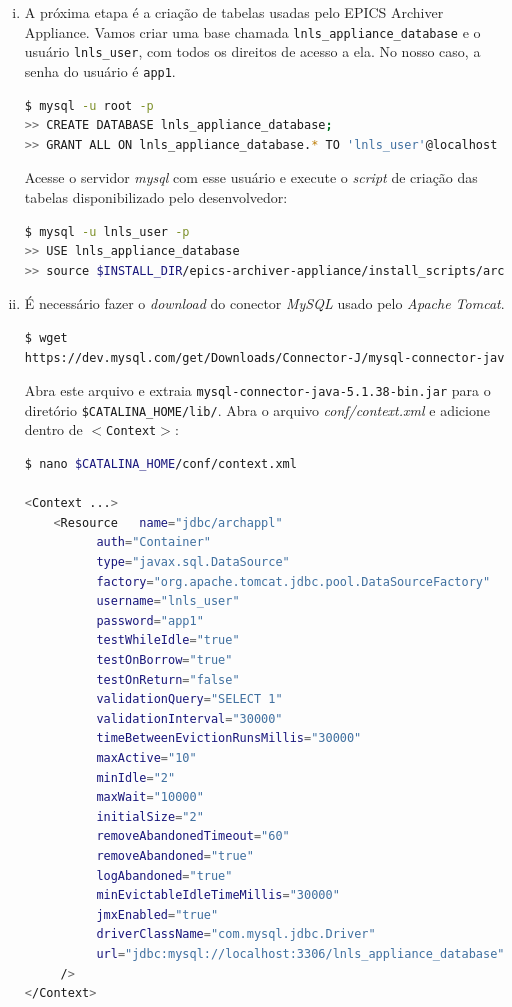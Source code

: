 \begin {enumerate}[i.]
\item \label{mysql-install}A próxima etapa é a criação de tabelas usadas pelo
EPICS Archiver Appliance. Vamos criar uma base chamada \texttt{lnls\_appliance\_database} e o
usuário \texttt{lnls\_user}, com todos os direitos de acesso a ela. No nosso
caso, a senha do usuário é \texttt{app1}. 

\begin{lstlisting}[language=bash, style=nonumbers]
$ mysql -u root -p
>> CREATE DATABASE lnls_appliance_database;
>> GRANT ALL ON lnls_appliance_database.* TO 'lnls_user'@localhost IDENTIFIED BY 'app1';
\end{lstlisting}

Acesse o servidor \textit{mysql} com esse usuário e execute o \textit{script}
de criação das tabelas disponibilizado pelo desenvolvedor:

\begin{lstlisting}[language=bash, style=nonumbers]
$ mysql -u lnls_user -p
>> USE lnls_appliance_database
>> source $INSTALL_DIR/epics-archiver-appliance/install_scripts/archappl_mysql.sql
\end{lstlisting}

\item É necessário fazer o \textit{download} do conector \textit{MySQL} usado
pelo \textit{Apache Tomcat}.

\begin{lstlisting}[language=bash, style=nonumbers]
$ wget
https://dev.mysql.com/get/Downloads/Connector-J/mysql-connector-java-5.1.38.tar.gz
\end{lstlisting} 

Abra este arquivo e extraia \texttt{mysql-connector-java-5.1.38-bin.jar} para o
diretório \texttt{\$CATALINA\_HOME/lib/}. Abra o arquivo
\textit{conf/context.xml} e adicione dentro de \texttt{\(<\)Context\(>\)}:

\begin{lstlisting}[language=bash, style=nonumbers]
$ nano $CATALINA_HOME/conf/context.xml

<Context ...>
	<Resource   name="jdbc/archappl"
	      auth="Container"
	      type="javax.sql.DataSource"
	      factory="org.apache.tomcat.jdbc.pool.DataSourceFactory"
	      username="lnls_user"
	      password="app1" 
	      testWhileIdle="true"
	      testOnBorrow="true"
	      testOnReturn="false"
	      validationQuery="SELECT 1"
	      validationInterval="30000"
	      timeBetweenEvictionRunsMillis="30000"
	      maxActive="10" 
	      minIdle="2" 
	      maxWait="10000" 
	      initialSize="2"
	      removeAbandonedTimeout="60"
	      removeAbandoned="true"
	      logAbandoned="true"
	      minEvictableIdleTimeMillis="30000" 
	      jmxEnabled="true"
	      driverClassName="com.mysql.jdbc.Driver"
	      url="jdbc:mysql://localhost:3306/lnls_appliance_database"
	 />
</Context>
\end{lstlisting}


\end{enumerate}
